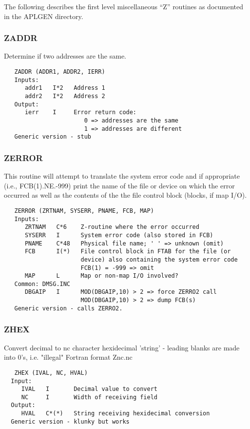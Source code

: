    The following describes the first level miscellaneous ``Z''
routines as documented in the APLGEN directory.

\subsubsection{ZADDR}
Determine if two addresses are the same.
\begin{verbatim}
   ZADDR (ADDR1, ADDR2, IERR)
   Inputs:
      addr1   I*2   Address 1
      addr2   I*2   Address 2
   Output:
      ierr    I     Error return code:
                       0 => addresses are the same
                       1 => addresses are different
   Generic version - stub
\end{verbatim}

\subsubsection{ZERROR}
This routine will attempt to translate the system error code and if
appropriate (i.e., FCB(1).NE.-999) print the name of the file or
device on which the error occurred as well as the contents of the
the file control block (blocks, if map I/O).
\begin{verbatim}
   ZERROR (ZRTNAM, SYSERR, PNAME, FCB, MAP)
   Inputs:
      ZRTNAM   C*6    Z-routine where the error occurred
      SYSERR   I      System error code (also stored in FCB)
      PNAME    C*48   Physical file name; ' ' => unknown (omit)
      FCB      I(*)   File control block in FTAB for the file (or
                      device) also containing the system error code
                      FCB(1) = -999 => omit
      MAP      L      Map or non-map I/O involved?
   Common: DMSG.INC
      DBGAIP   I      MOD(DBGAIP,10) > 2 => force ZERRO2 call
                      MOD(DBGAIP,10) > 2 => dump FCB(s)
   Generic version - calls ZERRO2.
\end{verbatim}

\subsubsection{ZHEX}
Convert decimal to nc character hexidecimal 'string' - leading
blanks are made into 0's, i.e. "illegal" Fortran format Znc.nc
\begin{verbatim}
   ZHEX (IVAL, NC, HVAL)
  Input:
     IVAL   I       Decimal value to convert
     NC     I       Width of receiving field
  Output:
     HVAL   C*(*)   String receiving hexidecimal conversion
  Generic version - klunky but works
\end{verbatim}

